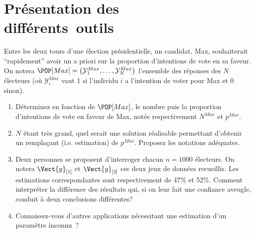 \documentclass[10pt]{report}
\begin{document}
\chapter{Présentation des\\ différents~outils}\label{TdPres}


\begin{exercice}

Entre les deux tours d'une élection présidentielle, un candidat, Max, souhaiterait ``rapidement'' avoir un a priori sur la proportion d'intentions de vote en sa faveur. On notera $\POP[Max]=\left( \mathcal{Y}_1^{Max},\ldots, \mathcal{Y}_N^{Max}\right)$ l'ensemble des réponses des $N$ électeurs (où $\mathcal{Y}_i^{Max}$ vaut 1 si l'individu $i$ a l'intention de voter pour Max et 0 sinon).

\begin{enumerate}
\item Déterminez en fonction de $\POP[Max]$, le nombre puis la proportion d'intentions de vote en faveur de Max, notée respectivement $N^{Max}$ et $p^{Max}$.


\item $N$ étant très grand, quel serait une solution réalisable permettant d'obtenir un remplaçant (i.e. estimation) de $p^{Max}$. Proposez les notations adéquates.


\item Deux personnes se proposent d'interroger chacun $n=1000$ électeurs. On notera $\Vect{y}_{[1]}$ et $\Vect{y}_{[2]}$ ces deux jeux de données recueillis. Les estimations correspondantes sont respectivement de 47\% et 52\%. Comment interpréter la différence des résultats qui, si on leur fait une confiance aveugle, conduit à deux conclusions différentes?


\item Connaissez-vous d'autres applications nécessitant une estimation d'un paramètre inconnu~?


\end{enumerate}
\end{exercice}
\end{document}
